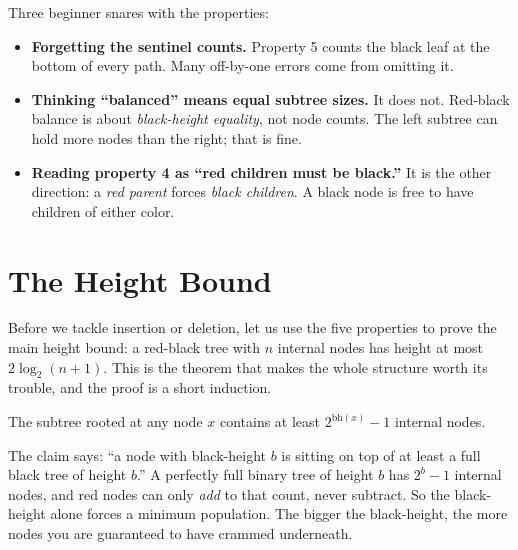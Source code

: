 \begin{trapbox}
Three beginner snares with the properties:
\begin{itemize}
\item \textbf{Forgetting the sentinel counts.} Property 5 counts the black leaf at
the bottom of every path. Many off-by-one errors come from omitting it.
\item \textbf{Thinking ``balanced'' means equal subtree sizes.} It does not.
Red-black balance is about \emph{black-height equality}, not node counts. The
left subtree can hold more nodes than the right; that is fine.
\item \textbf{Reading property 4 as ``red children must be black.''} It is the
other direction: a \emph{red parent} forces \emph{black children}. A black node is
free to have children of either color.
\end{itemize}
\end{trapbox}

\section{The Height Bound}

Before we tackle insertion or deletion, let us use the five properties to prove
the main height bound: a red-black tree with $n$ internal nodes has height at most
$2\log_2(n+1)$. This is the theorem that makes the whole structure worth its
trouble, and the proof is a short induction.

\begin{lemma}\label{ch13:lem-bh-size}
The subtree rooted at any node $x$ contains at least $2^{\mathrm{bh}(x)} - 1$
internal nodes.
\end{lemma}

\begin{intuitionbox}
The claim says: ``a node with black-height $b$ is sitting on top of at least a
full black tree of height $b$.'' A perfectly full binary tree of height $b$ has
$2^b - 1$ internal nodes, and red nodes can only \emph{add} to that count, never
subtract. So the black-height alone forces a minimum population. The bigger the
black-height, the more nodes you are guaranteed to have crammed underneath.
\end{intuitionbox}

